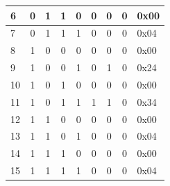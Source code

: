 \begin{table}[]
\begin{tabular}{|l|c|c|c|c|c|c|c|l|}
6                             & 0                & 1               & 1                      & 0                & 0                & 0                & 0                & 0x00                                 \\ \hline
7                             & 0                & 1               & 1                      & 1                & 0                & 0                & 0                & 0x04                                 \\ \hline
8                             & 1                & 0               & 0                      & 0                & 0                & 0                & 0                & 0x00                                 \\ \hline
9                             & 1                & 0               & 0                      & 1                & 0                & 1                & 0                & 0x24                                 \\ \hline
10                            & 1                & 0               & 1                      & 0                & 0                & 0                & 0                & 0x00                                 \\ \hline
11                            & 1                & 0               & 1                      & 1                & 1                & 1                & 0                & 0x34                                 \\ \hline
12                            & 1                & 1               & 0                      & 0                & 0                & 0                & 0                & 0x00                                 \\ \hline
13                            & 1                & 1               & 0                      & 1                & 0                & 0                & 0                & 0x04                                 \\ \hline
14                            & 1                & 1               & 1                      & 0                & 0                & 0                & 0                & 0x00                                 \\ \hline
15                            & 1                & 1               & 1                      & 1                & 0                & 0                & 0                & 0x04                                 \\ \hline
\end{tabular}
\end{table}


